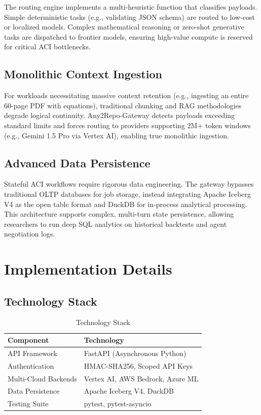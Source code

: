 \documentclass[10pt]{article}
\begin{document}
The routing engine implements a multi-heuristic function that classifies payloads. Simple deterministic tasks (e.g., validating JSON schema) are routed to low-cost or localized models. Complex mathematical reasoning or zero-shot generative tasks are dispatched to frontier models, ensuring high-value compute is reserved for critical ACI bottlenecks.

\subsection{Monolithic Context Ingestion}

For workloads necessitating massive context retention (e.g., ingesting an entire 60-page PDF with equations), traditional chunking and RAG methodologies degrade logical continuity. Any2Repo-Gateway detects payloads exceeding standard limits and forces routing to providers supporting 2M+ token windows (e.g., Gemini 1.5 Pro via Vertex AI), enabling true monolithic ingestion.

\subsection{Advanced Data Persistence}

Stateful ACI workflows require rigorous data engineering. The gateway bypasses traditional OLTP databases for job storage, instead integrating Apache Iceberg V4 as the open table format and DuckDB for in-process analytical processing. This architecture supports complex, multi-turn state persistence, allowing researchers to run deep SQL analytics on historical backtests and agent negotiation logs.

\section{Implementation Details}

\subsection{Technology Stack}

\begin{table}[h]
\centering
\begin{tabular}{|l|l|}
\hline
\textbf{Component} & \textbf{Technology} \\
\hline
API Framework & FastAPI (Asynchronous Python) \\
Authentication & HMAC-SHA256, Scoped API Keys \\
Multi-Cloud Backends & Vertex AI, AWS Bedrock, Azure ML \\
Data Persistence & Apache Iceberg V4, DuckDB \\
Testing Suite & pytest, pytest-asyncio \\
\hline
\end{tabular}
\caption{Technology Stack}
\end{table}
\end{document}
